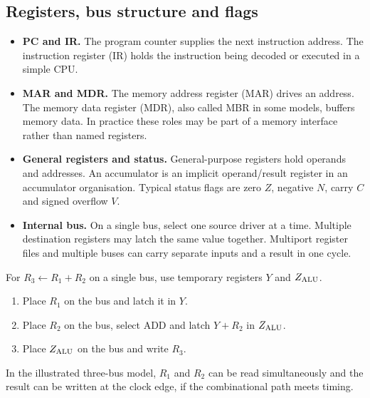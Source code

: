 \documentclass[12pt,a4paper]{article}
\begin{document}
\subsection{Registers, bus structure and flags}
\begin{itemize}[leftmargin=*,itemsep=3pt]
\item \textbf{PC and IR.} The program counter supplies the next instruction address. The instruction register (IR) holds the instruction being decoded or executed in a simple CPU.
\item \textbf{MAR and MDR.} The memory address register (MAR) drives an address. The memory data register (MDR), also called MBR in some models, buffers memory data. In practice these roles may be part of a memory interface rather than named registers.
\item \textbf{General registers and status.} General-purpose registers hold operands and addresses. An accumulator is an implicit operand/result register in an accumulator organisation. Typical status flags are zero $Z$, negative $N$, carry $C$ and signed overflow $V$.
\item \textbf{Internal bus.} On a single bus, select one source driver at a time. Multiple destination registers may latch the same value together. Multiport register files and multiple buses can carry separate inputs and a result in one cycle.
\end{itemize}
\begin{tcolorbox}[tikzbox,title={A three-bus register datapath},unbreakable]
\centering
{}
\end{tcolorbox}

\begin{tcolorbox}[examplebox,title={One-bus versus three-bus addition}]
For $R_3\leftarrow R_1+R_2$ on a single bus, use temporary registers $Y$ and $Z_{\rm ALU}$.
\begin{enumerate}[leftmargin=*,itemsep=2pt]
\item Place $R_1$ on the bus and latch it in $Y$.
\item Place $R_2$ on the bus, select ADD and latch $Y+R_2$ in $Z_{\rm ALU}$.
\item Place $Z_{\rm ALU}$ on the bus and write $R_3$.
\end{enumerate}
In the illustrated three-bus model, $R_1$ and $R_2$ can be read simultaneously and the result can be written at the clock edge, if the combinational path meets timing.
\end{tcolorbox}
\end{document}
